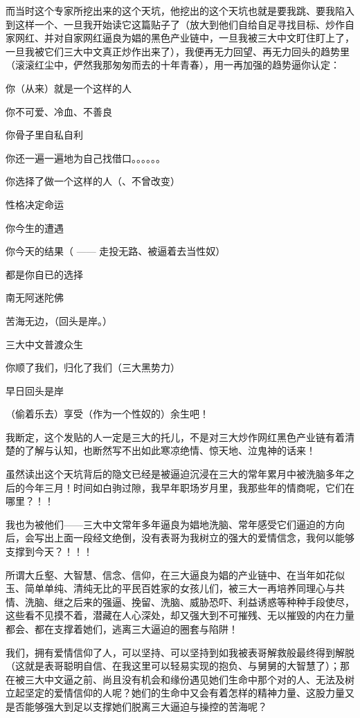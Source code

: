 \documentclass[9pt, b5paper]{article}
\begin{document}
而当时这个专家所挖出来的这个天坑，他挖出的这个天坑也就是要我跳、要我陷入到这样一个、一旦我开始读它这篇贴子了（放大到他们自给自足寻找目标、炒作自家网红、并对自家网红逼良为娼的黑色产业链中，一旦我被三大中文盯住盯上了，一旦我被它们三大中文真正炒作出来了），我便再无力回望、再无力回头的趋势里（滚滚红尘中，俨然我那匆匆而去的十年青春），用一再加强的趋势逼你认定：

你（从来）就是一个这样的人

你不可爱、冷血、不善良

你骨子里自私自利

你还一遍一遍地为自己找借口。。。。。。

你选择了做一个这样的人（、不曾改变）

性格决定命运

你今生的遭遇

你今天的结果（ —— 走投无路、被逼着去当性奴）

都是你自已的选择

南无阿迷陀佛

苦海无边，（回头是岸。）

三大中文普渡众生

你顺了我们，归化了我们（三大黑势力）

早日回头是岸

（偷着乐去）享受（作为一个性奴的）余生吧！

我断定，这个发贴的人一定是三大的托儿，不是对三大炒作网红黑色产业链有着清楚的了解与认知，也断然写不出如此寒凉绝情、惊天地、泣鬼神的话来！

虽然读出这个天坑背后的隐文已经是被逼迫沉浸在三大的常年累月中被洗脑多年之后的今年三月！时间如白驹过隙，我早年职场岁月里，我那些年的情商呢，它们在哪里？！！

我也为被他们——三大中文常年多年逼良为娼地洗脑、常年感受它们逼迫的方向后，会写出上面一段经文绝倒，没有表哥为我树立的强大的爱情信念，我何以能够支撑到今天？！！！

所谓大丘壑、大智慧、信念、信仰，在三大逼良为娼的产业链中、在当年如花似玉、简单单纯、清纯无比的平民百姓家的女孩儿们，被三大一再培养同理心与共情、洗脑、继之后来的强逼、挽留、洗脑、威胁恐吓、利益诱惑等种种手段使尽，这些看不见摸不着，潜藏在人心深处，却又强大到不可摧残、无以摧毁的内在力量都会、都在支撑着她们，逃离三大逼迫的圈套与陷阱！

我们，拥有爱情信仰了人，可以坚持、可以坚持到如我被表哥解救般最终得到解脱（这就是表哥聪明自信、在我这里可以轻易实现的抱负、与舅舅的大智慧了）；那在被三大中文逼之前、尚且没有机会和缘份遇见她们生命中那个对的人、无法及树立起坚定的爱情信仰的人呢？她们的生命中又会有着怎样的精神力量、这股力量又是否能够强大到足以支撑她们脱离三大逼迫与操控的苦海呢？
\end{document}
